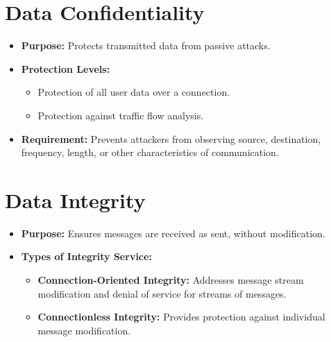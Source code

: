 \section{Data Confidentiality}
\begin{itemize}
    \item \textbf{Purpose:} Protects transmitted data from passive attacks.\label{DataConfidentialityPurpose}
    \item \textbf{Protection Levels:}
    \begin{itemize}
        \item Protection of all user data over a connection.\label{UserDataProtection}
        \item Protection against traffic flow analysis.\label{TrafficFlowAnalysis}
    \end{itemize}
    \item \textbf{Requirement:} Prevents attackers from observing source, destination, frequency, length, or other characteristics of communication.\label{DataConfidentialityRequirement}
\end{itemize}

\section{Data Integrity}
\begin{itemize}
    \item \textbf{Purpose:} Ensures messages are received as sent, without modification.\label{DataIntegrityPurpose}
    \item \textbf{Types of Integrity Service:}
    \begin{itemize}
        \item \textbf{Connection-Oriented Integrity:} Addresses message stream modification and denial of service for streams of messages.\label{ConnectionOrientedIntegrity}
        \item \textbf{Connectionless Integrity:} Provides protection against individual message modification.\label{ConnectionlessIntegrity}
    \end{itemize}
\end{itemize}

